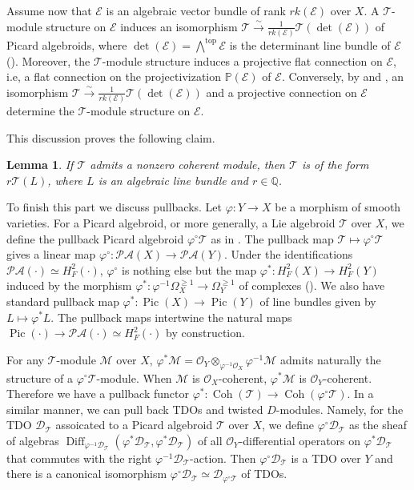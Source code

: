 \documentclass[12pt]{amsart}
\newcommand{\M}{\mathcal{M}}
\newcommand{\TT}{\mathscr{T}}
\newcommand{\pic}{\mathscr{PA}}
\newcommand{\OO}{\mathcal{O}}
\newcommand{\EE}{\mathcal{E}}
\newcommand{\coh}{\operatorname{Coh}}
\newtheorem{Lem}[Thm]{Lemma}
\theoremstyle{definition}
\numberwithin{equation}{section}
\begin{document}
Assume now that $\EE$ is an algebraic vector bundle of rank $rk(\EE)$ over $X$. A $\TT$-module structure on  $\EE$ induces an isomorphism $\TT \xrightarrow{\sim} \frac{1}{rk(\EE)} \TT(\det(\EE))$ of Picard algebroids, where $\det(\EE) = \bigwedge^{\operatorname{top}} \EE$ is the determinant line bundle of $\EE$ (\cite[Lemma 2.3.1 (ii)]{BB}). Moreover, the $\TT$-module structure induces a projective flat connection on $\EE$, i.e, a flat connection on the projectivization $\mathbb{P}(\EE)$ of $\EE$. Conversely, by \cite[Lemma 2.3.2]{BB} and \cite[Section 2]{BC}, an isomorphism $\TT \xrightarrow{\sim} \frac{1}{rk(\EE)} \TT(\det(\EE))$ and a projective connection on $\EE$ determine the $\TT$-module structure on $\EE$.

This discussion proves the following claim.

\begin{Lem}\label{Lem:algebroid_w_coh_module} If $\TT$ admits a nonzero coherent module, then
	$\TT$ is of the form $r \TT(L)$, where $L$ is an algebraic line bundle and $r \in \mathbb{Q}$.
\end{Lem}


To finish this part we discuss pullbacks.
Let $\varphi:Y \to X$ be a morphism of smooth varieties. For a Picard algebroid, or more generally, a Lie algebroid $\TT$ over $X$, we define the pullback Picard algebroid $\varphi^{\circ} \TT$ as in \cite[Section 1.4.6 and 2.2]{BB}. The pullback map $\TT \mapsto \varphi^{\circ}\TT$ gives a linear map $\varphi^{\circ}: \pic(X) \to \pic(Y)$. Under the identifications $\pic(\cdot) \simeq H^2_F(\cdot)$, $\varphi^{\circ}$ is nothing else but the map $\varphi^*: H^2_F(X) \to H^2_F(Y)$ induced by the morphism $\varphi^* : \varphi^{-1} \Omega^{\geqslant 1}_X \to \Omega^{\geqslant 1}_Y$ of complexes (\cite[Section 2.2]{BB}). We also have standard pullback map $\varphi^*: \operatorname{Pic}(X) \to \operatorname{Pic}(Y)$ of line bundles given by $L \mapsto \varphi^*L$. The pullback maps intertwine the natural maps $\operatorname{Pic}(\cdot) \to \pic(\cdot) \simeq H^2_F(\cdot)$ by construction.

For any $\TT$-module $\M$ over $X$, $\varphi^*\M = \OO_Y \otimes_{\varphi^{-1} \OO_X} \varphi^{-1} \M$ admits naturally the structure of a $\varphi^\circ \TT$-module.
When $\M$ is $\OO_X$-coherent, $\varphi^*\M$ is $\OO_Y$-coherent. Therefore we have a pullback functor $\varphi^*: \coh(\TT) \to \coh(\varphi^\circ \TT)$. In a similar manner, we can pull back TDOs and twisted $D$-modules. Namely, for the TDO $\mathscr{D}_\TT$ assoicated to a Picard algebroid $\TT$ over $X$, we define $\varphi^\circ \mathscr{D}_\TT$ as the sheaf of algebras $\operatorname{Diff}_{\varphi^{-1} \mathscr{D}_\TT} (\varphi^*\mathscr{D}_\TT, \varphi^*\mathscr{D}_\TT)$ of all $\OO_Y$-differential operators on $\varphi^*\mathscr{D}_\TT$ that commutes with the right $\varphi^{-1} \mathscr{D}_\TT$-action. Then $\varphi^\circ \mathscr{D}_\TT$ is a TDO over $Y$ and there is a canonical isomorphism $\varphi^\circ \mathscr{D}_\TT \simeq \mathscr{D}_{\varphi^\circ \TT}$ of TDOs.
\end{document}
